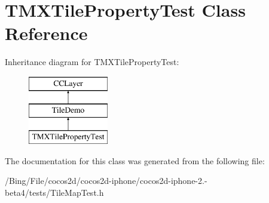 \hypertarget{interface_t_m_x_tile_property_test}{\section{T\-M\-X\-Tile\-Property\-Test Class Reference}
\label{interface_t_m_x_tile_property_test}
}
Inheritance diagram for T\-M\-X\-Tile\-Property\-Test\-:\begin{figure}[H]
\begin{center}
\leavevmode
\includegraphics[height=3.000000cm]{interface_t_m_x_tile_property_test}
\end{center}
\end{figure}


The documentation for this class was generated from the following file\-:\begin{DoxyCompactItemize}
\item 
/\-Bing/\-File/cocos2d/cocos2d-\/iphone/cocos2d-\/iphone-\/2.-\/beta4/tests/Tile\-Map\-Test.\-h\end{DoxyCompactItemize}
